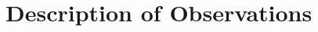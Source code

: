 \documentclass[12pt,a4paper]{article}  %
\begin{document}



%
%
 

%





\section{Description of Observations}\label{sec:desc_obs}
\end{document}
